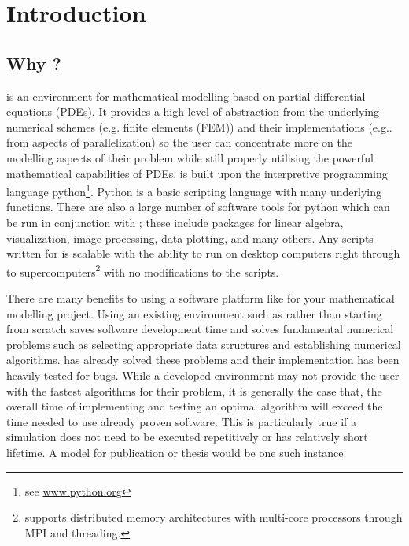 
%
%
%

\chapter{Introduction}
\label{CHAP INTRO}
\section{Why \esc?}
\esc is an environment for mathematical modelling based on partial differential equations (PDEs). It provides a high-level of abstraction from the underlying numerical schemes (e.g. finite elements (FEM)) and their implementations (e.g.. from aspects of parallelization) so the user can concentrate more on the modelling aspects of their problem while still properly utilising the powerful mathematical capabilities of PDEs. \esc is built upon the interpretive programming language python\footnote{see \url{www.python.org} }. Python is a basic scripting language with many underlying functions. There are also  a large number of software tools for python which can be run in conjunction with \esc; these include packages for linear algebra, visualization, image processing, data plotting, and many others. Any scripts written for \esc is scalable with the ability to run on desktop computers right through to supercomputers\footnote{\esc supports distributed memory architectures with multi-core processors through MPI and threading.} with no modifications to the scripts. 

There are many benefits to using a software platform like \esc for your mathematical modelling project. Using an existing environment such as \esc rather than starting from scratch saves software development time and solves fundamental numerical problems such as selecting appropriate data structures and establishing numerical algorithms. \esc has already solved these problems and their implementation has been heavily tested for bugs. While a developed environment may not provide the user with the fastest algorithms for their problem, it is generally the case that, the overall time of implementing and testing an optimal algorithm will exceed the time needed to use already proven software. This is particularly true if a simulation does not need to be executed repetitively or has relatively short lifetime. A model for publication or thesis would be one such instance. 

